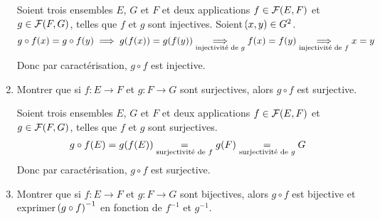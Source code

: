 \documentclass[a4paper,french,bookmarks]{book}
\begin{document}
\begin{enumerate}
        \noafter
        \nobefore
        \yesafter
        \begin{nproof}
            Soient trois ensembles $E$, $G$ et $F$ et deux applications $f \in \mathcal{F}\!\left(E, F\right)$ et $g \in \mathcal{F}\!\left(F, G\right)$, telles que $f$ et $g$ sont injectives. Soient $\!\left(x, y\right) \in G^2$.
            \[ g \circ f \p{x} = g \circ f \p{y} \implies g\p{f\p{x}} = g\p{f\p{y}} \underset{\text{injectivité de } g}{\implies} f\p{x} = f\p{y} \underset{\text{injectivité de } f}{\implies} x = y\]
            Donc par caractérisation, $g \circ f$ est injective.
        \end{nproof}
        \yesbefore
        
        \item Montrer que si $f : E \to F$ et $g : F \to G$ sont surjectives, alors $g \circ f$ est surjective.
        
        \noafter
        \nobefore
        \yesafter
        \begin{nproof}
            Soient trois ensembles $E$, $G$ et $F$ et deux applications $f \in \mathcal{F}\!\left(E, F\right)$ et $g \in \mathcal{F}\!\left(F, G\right)$, telles que $f$ et $g$ sont surjectives.
            \[ g \circ f\p{E} = g\p{f\p{E}} \eq{\text{surjectivité de } f} g\p{F} \eq{\text{surjectivité de } g} G\]
            Donc par caractérisation, $g \circ f$ est surjective.
        \end{nproof}
        \yesbefore
        
        \item Montrer que si $f : E \to F$ et $g : F \to G$ sont bijectives, alors $g \circ f$ est bijective et exprimer $\!\left(g \circ f\right)^{-1}$ en fonction de $f^{-1}$ et $g^{-1}$.
        

\end{enumerate}
\end{document}
